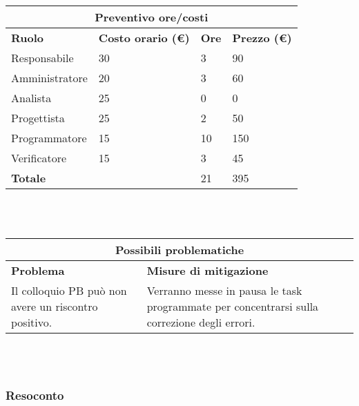\documentclass[a4paper, 12pt]{article}
\begin{document}
\begin{center}
    \begin{tabularx}{\textwidth}{|X|X|X|X|}
        \hline
        \multicolumn{4}{|c|}{\textbf{Preventivo ore/costi}}\\
        \hline
        \hline
        \textbf{Ruolo} & \textbf{Costo orario (\euro)} & \textbf{Ore} & \textbf{Prezzo (\euro)}\\
        \hline
        Responsabile    & 30 & 3  & 90\\
        \hline
        Amministratore  & 20 & 3  & 60\\
        \hline
        Analista        & 25 & 0  & 0\\
        \hline
        Progettista     & 25 & 2  & 50\\
        \hline
        Programmatore   & 15 & 10  & 150\\
        \hline
        Verificatore    & 15 & 3  & 45\\
        \hline
        \hline
        \textbf{Totale} &    & 21 & 395\\
        \hline
    \end{tabularx}\\[8pt]
    \mbox{}\\
\end{center}

\begin{center}
    \begin{tabularx}{\textwidth}{|X|X|}
        \hline
        \multicolumn{2}{|c|}{\textbf{Possibili problematiche}}\\
        \hline
        \hline
        \textbf{Problema} & \textbf{Misure di mitigazione}\\
        \hline
        Il colloquio PB può non avere un riscontro positivo. & Verranno messe in pausa le task programmate per concentrarsi sulla correzione degli errori.\\
        \hline
    \end{tabularx}\\[8pt]
    \mbox{}\\
\end{center}
\subsubsection{Resoconto}\mbox{}
\end{document}

